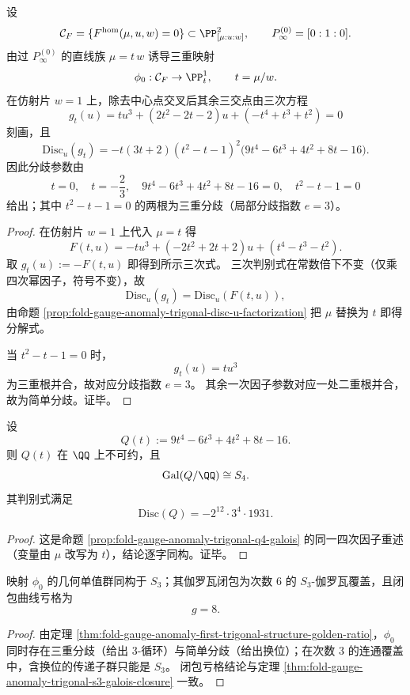 \begin{theorem}[第一三重结构的参数判别式与黄金比三重分歧]\label{thm:fold-gauge-anomaly-first-trigonal-structure-golden-ratio}
设
\[
\mathcal C_F=\{F^{\mathrm{hom}}(\mu,u,w)=0\}\subset\PP^2_{[\mu:u:w]},
\qquad
P_\infty^{(0)}=[0:1:0].
\]
由过 \(P_\infty^{(0)}\) 的直线族 \(\mu=t\,w\) 诱导三重映射
\[
\phi_0:\mathcal C_F\to\PP^1_t,\qquad t=\mu/w.
\]
在仿射片 \(w=1\) 上，除去中心点交叉后其余三交点由三次方程
\[
g_t(u)=t u^3+(2t^2-2t-2)u+(-t^4+t^3+t^2)=0
\]
刻画，且
\[
\mathrm{Disc}_u(g_t)= -t(3t+2)(t^2-t-1)^2\bigl(9t^4-6t^3+4t^2+8t-16\bigr).
\]
因此分歧参数由
\[
t=0,\quad t=-\frac23,\quad 9t^4-6t^3+4t^2+8t-16=0,\quad t^2-t-1=0
\]
给出；其中 \(t^2-t-1=0\) 的两根为三重分歧（局部分歧指数 \(e=3\)）。
\end{theorem}
\begin{proof}
在仿射片 \(w=1\) 上代入 \(\mu=t\) 得
\[
F(t,u)=-t u^3+(-2t^2+2t+2)u+(t^4-t^3-t^2).
\]
取 \(g_t(u):=-F(t,u)\) 即得到所示三次式。
三次判别式在常数倍下不变（仅乘四次幂因子，符号不变），故
\[
\mathrm{Disc}_u(g_t)=\mathrm{Disc}_u(F(t,u)),
\]
由命题 \ref{prop:fold-gauge-anomaly-trigonal-disc-u-factorization} 把 \(\mu\) 替换为 \(t\) 即得分解式。

当 \(t^2-t-1=0\) 时，
\[
g_t(u)=t u^3
\]
为三重根并合，故对应分歧指数 \(e=3\)。
其余一次因子参数对应一处二重根并合，故为简单分歧。证毕。
\end{proof}

\begin{proposition}[第一三重结构四次分歧因子的伽罗瓦群]\label{prop:fold-gauge-anomaly-first-trigonal-q4-s4}
设
\[
Q(t):=9t^4-6t^3+4t^2+8t-16.
\]
则 \(Q(t)\) 在 \(\QQ\) 上不可约，且
\[
\mathrm{Gal}(Q/\QQ)\cong S_4.
\]
其判别式满足
\[
\mathrm{Disc}(Q)=-2^{12}\cdot 3^4\cdot 1931.
\]
\end{proposition}
\begin{proof}
这是命题 \ref{prop:fold-gauge-anomaly-trigonal-q4-galois} 的同一四次因子重述（变量由 \(\mu\) 改写为 \(t\)），结论逐字同构。证毕。
\end{proof}

\begin{corollary}[第一三重结构的几何单值群与伽罗瓦闭包亏格]\label{cor:fold-gauge-anomaly-first-trigonal-monodromy-genus}
映射 \(\phi_0\) 的几何单值群同构于 \(S_3\)；其伽罗瓦闭包为次数 \(6\) 的 \(S_3\)-伽罗瓦覆盖，且闭包曲线亏格为
\[
g=8.
\]
\end{corollary}
\begin{proof}
由定理 \ref{thm:fold-gauge-anomaly-first-trigonal-structure-golden-ratio}，\(\phi_0\) 同时存在三重分歧（给出 \(3\)-循环）与简单分歧（给出换位）；在次数 \(3\) 的连通覆盖中，含换位的传递子群只能是 \(S_3\)。
闭包亏格结论与定理 \ref{thm:fold-gauge-anomaly-trigonal-s3-galois-closure} 一致。
\end{proof}

